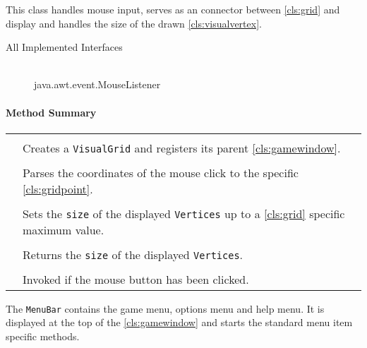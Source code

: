 This class handles mouse input, serves as an connector between \ref{cls:grid} and display and handles the size of the drawn \ref{cls:visualvertex}. \\ 
\begin{description}
	\item[All Implemented Interfaces] \hfill \\
	java.awt.event.MouseListener
\end{description}
\centerdash

\paragraph*{Method Summary}
\paragraph*{}
\begin{longtable}{Lp{10cm}}
	\startmethodtable
	 \\
	& Creates a \texttt{VisualGrid} and registers its parent \ref{cls:gamewindow}. \\
	 \\
	& Parses the coordinates of the mouse click to the specific \ref{cls:gridpoint}. \\
	 \\
	& Sets the \texttt{size} of the displayed \texttt{Vertices} up to a \ref{cls:grid} specific maximum value. \\
	 \\
	& Returns the \texttt{size} of the displayed \texttt{Vertices}. \\ 
	 \\
	& Invoked if the mouse button has been clicked. \\ 
	\hline
\end{longtable}
\pagebreak


The \texttt{MenuBar} contains the game menu, options menu and help menu. It is displayed at the top of the \ref{cls:gamewindow} and starts the standard menu item specific methods. \\


